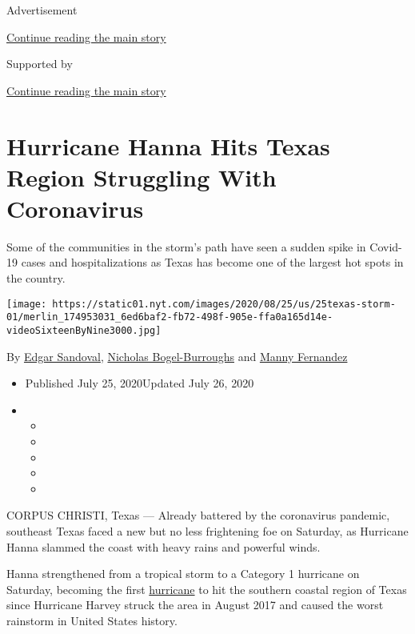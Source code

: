 Advertisement

\protect\hyperlink{after-top}{Continue reading the main story}

Supported by

\protect\hyperlink{after-sponsor}{Continue reading the main story}

\hypertarget{hurricane-hanna-hits-texas-region-struggling-with-coronavirus}{%
\section{Hurricane Hanna Hits Texas Region Struggling With
Coronavirus}\label{hurricane-hanna-hits-texas-region-struggling-with-coronavirus}}

Some of the communities in the storm's path have seen a sudden spike in
Covid-19 cases and hospitalizations as Texas has become one of the
largest hot spots in the country.

\texttt{[image: https://static01.nyt.com/images/2020/08/25/us/25texas-storm-01/merlin\_174953031\_6ed6baf2-fb72-498f-905e-ffa0a165d14e-videoSixteenByNine3000.jpg]}

By \href{https://www.nytimes.com/by/edgar-sandoval}{Edgar Sandoval},
\href{https://www.nytimes.com/by/nicholas-bogel-burroughs}{Nicholas
Bogel-Burroughs} and
\href{https://www.nytimes.com/by/manny-fernandez}{Manny Fernandez}

\begin{itemize}
\item
  Published July 25, 2020Updated July 26, 2020
\item
  \begin{itemize}
  \item
  \item
  \item
  \item
  \item
  \end{itemize}
\end{itemize}

CORPUS CHRISTI, Texas --- Already battered by the coronavirus pandemic,
southeast Texas faced a new but no less frightening foe on Saturday, as
Hurricane Hanna slammed the coast with heavy rains and powerful winds.

Hanna strengthened from a tropical storm to a Category 1 hurricane on
Saturday, becoming the first
\href{https://www.nytimes.com/2020/07/26/us/hurricane-douglas-hawaii.html}{hurricane}
to hit the southern coastal region of Texas since Hurricane Harvey
struck the area in August 2017 and caused the worst rainstorm in United
States history.

